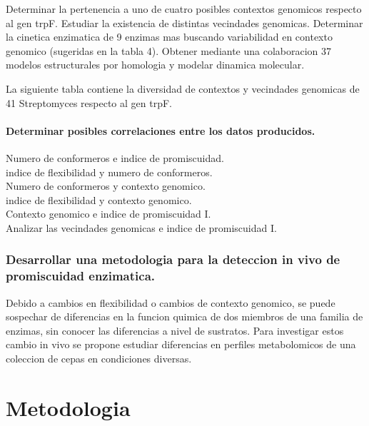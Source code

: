 \documentclass[12pt,twoside]{reedthesis}
\begin{document}
  Determinar la pertenencia a uno de cuatro posibles contextos genomicos
  respecto al gen trpF. Estudiar la existencia de distintas vecindades
  genomicas. Determinar la cinetica enzimatica de 9 enzimas mas buscando
  variabilidad en contexto genomico (sugeridas en la tabla 4). Obtener
  mediante una colaboracion 37 modelos estructurales por homologia y
  modelar dinamica molecular.
  
  La siguiente tabla contiene la diversidad de contextos y vecindades
  genomicas de 41 Streptomyces respecto al gen trpF.
  
  \subsubsection{Determinar posibles correlaciones entre los datos
  producidos.}\label{determinar-posibles-correlaciones-entre-los-datos-producidos.}
  
  Numero de conformeros e indice de promiscuidad.\\
  indice de flexibilidad y numero de conformeros.\\
  Numero de conformeros y contexto genomico.\\
  indice de flexibilidad y contexto genomico.\\
  Contexto genomico e indice de promiscuidad I.\\
  Analizar las vecindades genomicas e indice de promiscuidad I.
  
  \subsection{Desarrollar una metodologia para la deteccion in vivo de
  promiscuidad
  enzimatica.}\label{desarrollar-una-metodologia-para-la-deteccion-in-vivo-de-promiscuidad-enzimatica.}
  
  Debido a cambios en flexibilidad o cambios de contexto genomico, se
  puede sospechar de diferencias en la funcion quimica de dos miembros de
  una familia de enzimas, sin conocer las diferencias a nivel de
  sustratos. Para investigar estos cambio in vivo se propone estudiar
  diferencias en perfiles metabolomicos de una coleccion de cepas en
  condiciones diversas.
  
  \clearpage  
  
  \chapter*{Metodologia}\label{metodologia}
  
\end{document}
